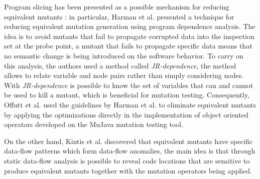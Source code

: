Program slicing has been presented as a possible mechanism for reducing equivalent mutants \cite{voas1997software, hierons1999using, harman2001relationship}: in particular, Harman et al. \cite{harman2001relationship} presented a technique for reducing equivalent mutation generation using program dependence analysis. The idea is to avoid mutants that fail to propagate corrupted data into the inspection set at the probe point, a mutant that fails to propagate specific data means that no semantic change is being introduced on the software behavior. To carry on this analysis, the authors used a method called \textit{JR-dependence}, the method allows to relate variable and node pairs rather than simply considering nodes. With \textit{JR-dependence} is possible to know the set of variables that can and cannot be used to kill a mutant, which is beneficial for mutation testing. 
Consequently, Offutt et al. \cite{offutt2006class} used the guidelines by Harman et al. \cite{harman2001relationship} to eliminate equivalent mutants by applying the optimizations directly in the implementation of object oriented operators developed on the MuJava mutation testing tool. 

On the other hand, Kintis et al. \cite{kintis2014using,kintis2015medic} discovered that equivalent mutants have specific data-flow patterns which form data-flow anomalies, the main idea is that through static data-flow analysis is possible to reveal code locations that are sensitive to produce equivalent mutants together with the mutation operators being applied.

